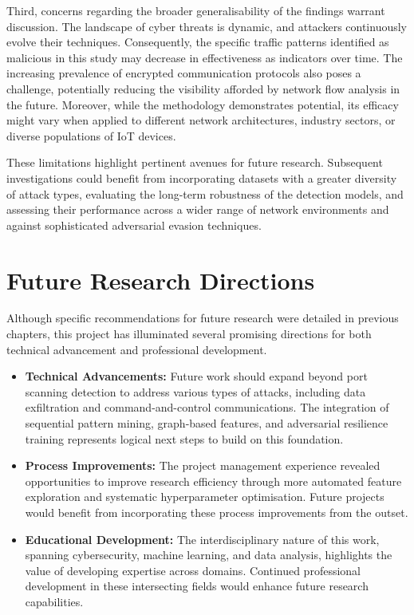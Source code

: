 Third, concerns regarding the broader generalisability of the findings warrant discussion. The landscape of cyber threats is dynamic, and attackers continuously evolve their techniques. Consequently, the specific traffic patterns identified as malicious in this study may decrease in effectiveness as indicators over time. The increasing prevalence of encrypted communication protocols also poses a challenge, potentially reducing the visibility afforded by network flow analysis in the future. Moreover, while the methodology demonstrates potential, its efficacy might vary when applied to different network architectures, industry sectors, or diverse populations of IoT devices.

These limitations highlight pertinent avenues for future research. Subsequent investigations could benefit from incorporating datasets with a greater diversity of attack types, evaluating the long-term robustness of the detection models, and assessing their performance across a wider range of network environments and against sophisticated adversarial evasion techniques.

\section{Future Research Directions}

Although specific recommendations for future research were detailed in previous chapters, this project has illuminated several promising directions for both technical advancement and professional development.

\begin{itemize}
    \item \textbf{Technical Advancements:} Future work should expand beyond port scanning detection to address various types of attacks, including data exfiltration and command-and-control communications. The integration of sequential pattern mining, graph-based features, and adversarial resilience training represents logical next steps to build on this foundation.
    
    \item \textbf{Process Improvements:} The project management experience revealed opportunities to improve research efficiency through more automated feature exploration and systematic hyperparameter optimisation. Future projects would benefit from incorporating these process improvements from the outset.
    
    \item \textbf{Educational Development:} The interdisciplinary nature of this work, spanning cybersecurity, machine learning, and data analysis, highlights the value of developing expertise across domains. Continued professional development in these intersecting fields would enhance future research capabilities.
\end{itemize}

